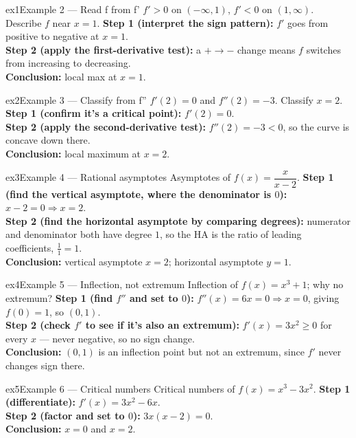 \documentclass[11pt]{article}
\begin{document}
\begin{example}{ex1}{Example 2 --- Read f from f'}
$f'>0$ on $(-\infty,1)$, $f'<0$ on $(1,\infty)$. Describe $f$ near $x=1$.\soln
\textbf{Step 1 (interpret the sign pattern):} $f'$ goes from positive to negative at $x=1$.\\[3pt]
\textbf{Step 2 (apply the first-derivative test):} a $+\to-$ change means $f$ switches from increasing to decreasing.\\[3pt]
\textbf{Conclusion:} local max at $x=1$.
\end{example}

\begin{example}{ex2}{Example 3 --- Classify from f''}
$f'(2)=0$ and $f''(2)=-3$. Classify $x=2$.\soln
\textbf{Step 1 (confirm it's a critical point):} $f'(2)=0$.\\[3pt]
\textbf{Step 2 (apply the second-derivative test):} $f''(2)=-3<0$, so the curve is concave down there.\\[3pt]
\textbf{Conclusion:} local maximum at $x=2$.
\end{example}

\begin{example}{ex3}{Example 4 --- Rational asymptotes}
Asymptotes of $f(x)=\dfrac{x}{x-2}$.\soln
\textbf{Step 1 (find the vertical asymptote, where the denominator is $0$):} $x-2=0\Rightarrow x=2$.\\[3pt]
\textbf{Step 2 (find the horizontal asymptote by comparing degrees):} numerator and denominator both have degree $1$, so the HA is the ratio of leading coefficients, $\tfrac11=1$.\\[3pt]
\textbf{Conclusion:} vertical asymptote $x=2$; horizontal asymptote $y=1$.
\end{example}

\begin{example}{ex4}{Example 5 --- Inflection, not extremum}
Inflection of $f(x)=x^3+1$; why no extremum?\soln
\textbf{Step 1 (find $f''$ and set to $0$):} $f''(x)=6x=0\Rightarrow x=0$, giving $f(0)=1$, so $(0,1)$.\\[3pt]
\textbf{Step 2 (check $f'$ to see if it's also an extremum):} $f'(x)=3x^2\ge0$ for every $x$ --- never negative, so no sign change.\\[3pt]
\textbf{Conclusion:} $(0,1)$ is an inflection point but not an extremum, since $f'$ never changes sign there.
\end{example}

\begin{example}{ex5}{Example 6 --- Critical numbers}
Critical numbers of $f(x)=x^3-3x^2$.\soln
\textbf{Step 1 (differentiate):} $f'(x)=3x^2-6x$.\\[3pt]
\textbf{Step 2 (factor and set to $0$):} $3x(x-2)=0$.\\[3pt]
\textbf{Conclusion:} $x=0$ and $x=2$.
\end{example}
\end{document}
